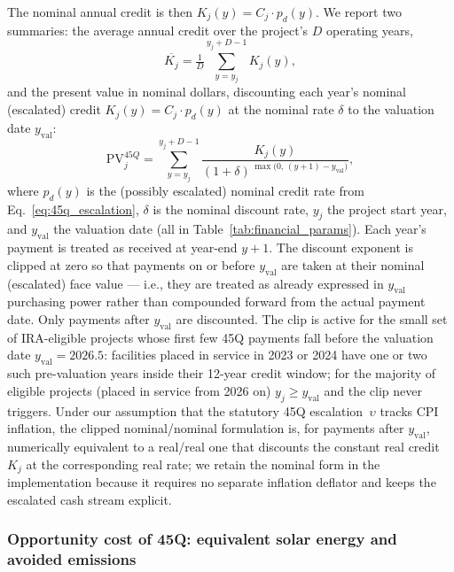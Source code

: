 \documentclass[11pt]{article}
\begin{document}
The nominal annual credit is then $K_j(y) = C_j \cdot p_d(y)$. We report two summaries: the average annual credit over the project's $D$ operating years,
%
\begin{equation*}
  \overline{K_j} = \tfrac{1}{D}\sum_{y=y_j}^{y_j+D-1} K_j(y),
\end{equation*}
%
and the present value in nominal dollars, discounting each year's nominal (escalated) credit $K_j(y) = C_j \cdot p_d(y)$ at the nominal rate $\delta$ to the valuation date $y_{\text{val}}$:
%
\begin{equation}
  \text{PV}_j^{45Q} = \sum_{y=y_j}^{y_j + D - 1} \frac{K_j(y)}{(1 + \delta)^{\,\max\!\bigl(0,\,(y + 1) - y_{\text{val}}\bigr)}},
  \label{eq:pv}
\end{equation}
%
where $p_d(y)$ is the (possibly escalated) nominal credit rate from Eq.~\eqref{eq:45q_escalation}, $\delta$ is the nominal discount rate, $y_j$ the project start year, and $y_{\text{val}}$ the valuation date (all in Table~\ref{tab:financial_params}). Each year's payment is treated as received at year-end $y + 1$. The discount exponent is clipped at zero so that payments on or before $y_{\text{val}}$ are taken at their nominal (escalated) face value --- i.e., they are treated as already expressed in $y_{\text{val}}$ purchasing power rather than compounded forward from the actual payment date. Only payments after $y_{\text{val}}$ are discounted. The clip is active for the small set of IRA-eligible projects whose first few 45Q payments fall before the valuation date $y_{\text{val}} = 2026.5$: facilities placed in service in 2023 or 2024 have one or two such pre-valuation years inside their 12-year credit window; for the majority of eligible projects (placed in service from 2026 on) $y_j \geq y_{\text{val}}$ and the clip never triggers. Under our assumption that the statutory 45Q escalation~$\upsilon$ tracks CPI inflation, the clipped nominal/nominal formulation is, for payments after $y_{\text{val}}$, numerically equivalent to a real/real one that discounts the constant real credit $K_j$ at the corresponding real rate; we retain the nominal form in the implementation because it requires no separate inflation deflator and keeps the escalated cash stream explicit.

\subsubsection{Opportunity cost of 45Q: equivalent solar energy and avoided emissions}
\label{sec:solar_counterfactual}
\end{document}
